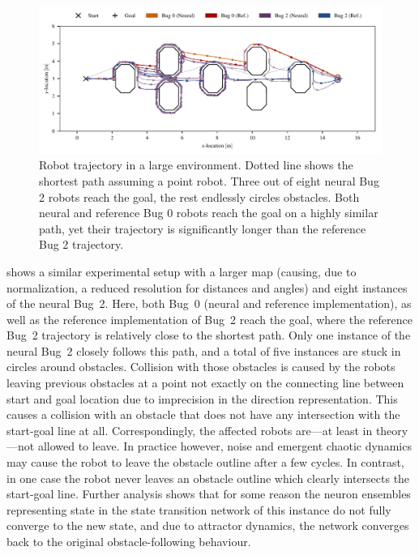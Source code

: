 \documentclass[letterpaper,10pt,conference]{ieeeconf}
\begin{document}
\begin{figure}
	\centering
	\includegraphics{media/vis_traj_map_02b_bug_0_neural_bug_0_ref_bug_2_neural_bug_2_ref.pdf}
	\caption{Robot trajectory in a large environment. Dotted line shows the shortest path assuming a point robot. Three out of eight neural Bug 2 robots reach the goal, the rest endlessly circles obstacles. Both neural and reference Bug 0 robots reach the goal on a highly similar path, yet their trajectory is significantly longer than the reference Bug 2 trajectory.}
	\label{fig:experiment_2_trajectory}
\end{figure}
 shows a similar experimental setup with a larger map (causing, due to normalization, a reduced resolution for distances and angles) and eight instances of the neural Bug~2. Here, both Bug~0 (neural and reference implementation), as well as the reference implementation of Bug~2 reach the goal, where the reference Bug~2 trajectory is relatively close to the shortest path. Only one instance of the neural Bug~2 closely follows this path, and a total of five instances are stuck in circles around obstacles. Collision with those obstacles is caused by the robots leaving previous obstacles at a point not exactly on the connecting line between start and goal location due to imprecision in the direction representation. This causes a collision with an obstacle that does not have any intersection with the start-goal line at all. Correspondingly, the affected robots are---at least in theory---not allowed to leave. In practice however, noise and emergent chaotic dynamics may cause the robot to leave the obstacle outline after a few cycles. In contrast, in one case the robot never leaves an obstacle outline which clearly intersects the start-goal line. Further analysis shows that for some reason the neuron ensembles representing state in the state transition network of this instance do not fully converge to the new state, and due to attractor dynamics, the network converges back to the original obstacle-following behaviour.
\end{document}
